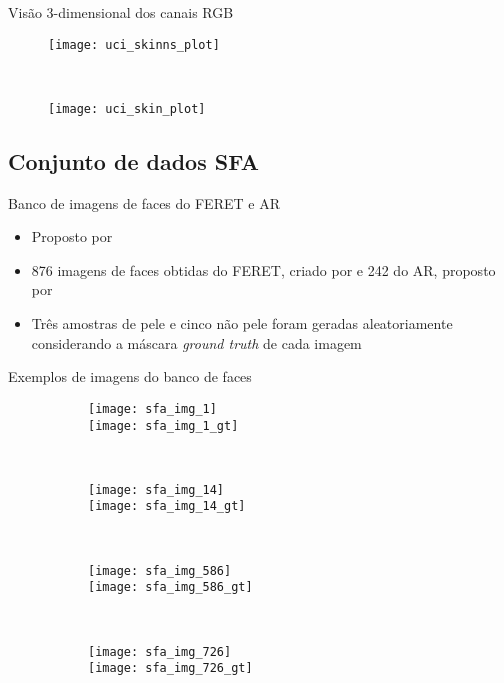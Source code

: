 \begin{frame}{Visão 3-dimensional dos canais RGB}
\begin{figure}[h]
    \centering
    \begin{minipage}{0.45\textwidth}
        \texttt{[image: uci\_skinns\_plot]}
    \end{minipage}
    ~ %
    \begin{minipage}{0.45\textwidth}
        \texttt{[image: uci\_skin\_plot]}
    \end{minipage}
    \label{fig:dataset_uci}
\end{figure}
\end{frame}

\subsection{Conjunto de dados SFA}
\begin{frame}{Banco de imagens de faces do FERET e AR}
  \begin{itemize}
      \item Proposto por \citet{sfa-skin-dataset:13}
      \item 876 imagens de faces obtidas do FERET, criado por \citet{feret:96} e 242 do AR, proposto por \citet{ar-face-database:98}
      \item Três amostras de pele e cinco não pele foram geradas aleatoriamente considerando a máscara \emph{ground truth} de cada imagem
  \end{itemize}
\end{frame}

\begin{frame}{Exemplos de imagens do banco de faces}
\begin{figure}[h]
    \centering
    \begin{subfigure}[t]{0.17\textwidth}
        \texttt{[image: sfa\_img\_1]}\\
        \texttt{[image: sfa\_img\_1\_gt]}
    \end{subfigure}
    ~
    \begin{subfigure}[t]{0.17\textwidth}
        \texttt{[image: sfa\_img\_14]}\\
        \texttt{[image: sfa\_img\_14\_gt]}
    \end{subfigure}
    ~
    \begin{subfigure}[t]{0.17\textwidth}
        \texttt{[image: sfa\_img\_586]}\\
        \texttt{[image: sfa\_img\_586\_gt]}
    \end{subfigure}
    ~ %
    \begin{subfigure}[t]{0.17\textwidth}
        \texttt{[image: sfa\_img\_726]}\\
        \texttt{[image: sfa\_img\_726\_gt]}
    \end{subfigure}
\end{figure}
\end{frame}

